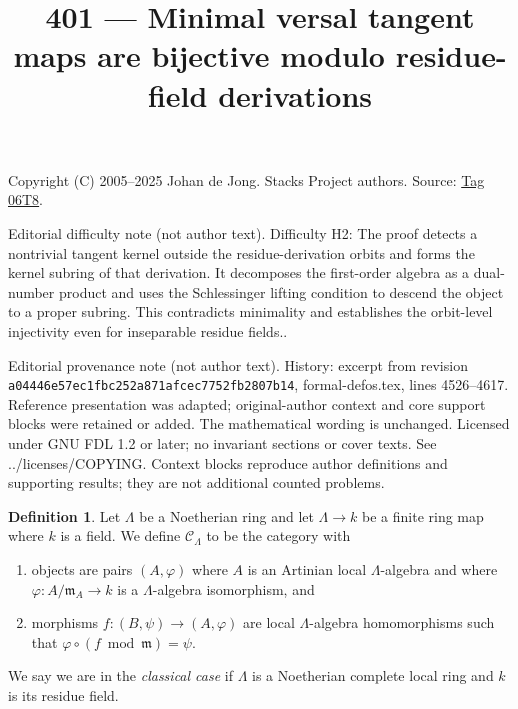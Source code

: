 \documentclass{amsart}
\theoremstyle{plain}
\theoremstyle{definition}
\newtheorem{definition}[subsection]{Definition}
\theoremstyle{remark}
\numberwithin{equation}{subsection}
\begin{document}
\title[Stacks Project, Tag 06T8]{401 --- Minimal versal tangent maps are bijective modulo residue-field derivations}
\maketitle
\noindent Copyright (C) 2005--2025 Johan de Jong. Stacks Project authors. Source: \href{https://stacks.math.columbia.edu/tag/06T8}{Tag 06T8}.

\noindent Editorial difficulty note (not author text). Difficulty H2: The proof detects a nontrivial tangent kernel outside the residue-derivation orbits and forms the kernel subring of that derivation. It decomposes the first-order algebra as a dual-number product and uses the Schlessinger lifting condition to descend the object to a proper subring. This contradicts minimality and establishes the orbit-level injectivity even for inseparable residue fields..

\noindent Editorial provenance note (not author text). History: excerpt from revision \texttt{a0444\allowbreak 6e57e\allowbreak c1fbc\allowbreak 252a8\allowbreak 71afc\allowbreak ec775\allowbreak 2fb28\allowbreak 07b14}, formal-defos.tex, lines 4526--4617. Reference presentation was adapted; original-author context and core support blocks were retained or added. The mathematical wording is unchanged. Licensed under GNU FDL 1.2 or later; no invariant sections or cover texts. See ../licenses/COPYING. Context blocks reproduce author definitions and supporting results; they are not additional counted problems.

\begin{definition}
\label{definition-CLambda}
Let $\Lambda$ be a Noetherian ring and let $\Lambda \to k$ be a finite
ring map where $k$ is a field. We define {\it $\mathcal{C}_\Lambda$} to be
the category with
\begin{enumerate}
\item objects are pairs $(A, \varphi)$ where $A$ is an Artinian local
$\Lambda$-algebra and where $\varphi : A/\mathfrak m_A \to k$ is a
$\Lambda$-algebra isomorphism, and
\item morphisms $f : (B, \psi) \to (A, \varphi)$ are local $\Lambda$-algebra
homomorphisms such that $\varphi \circ (f \bmod \mathfrak m) = \psi$.
\end{enumerate}
We say we are in the {\it classical case} if $\Lambda$ is a Noetherian
complete local ring and $k$ is its residue field.
\end{definition}
\end{document}
